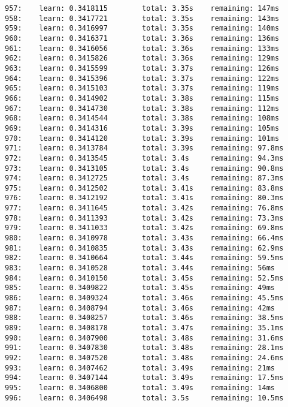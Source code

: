 \documentclass[11pt]{article}
\begin{document}
\begin{Verbatim}[commandchars=\\\{\}]
957:    learn: 0.3418115        total: 3.35s    remaining: 147ms
958:    learn: 0.3417721        total: 3.35s    remaining: 143ms
959:    learn: 0.3416997        total: 3.35s    remaining: 140ms
960:    learn: 0.3416371        total: 3.36s    remaining: 136ms
961:    learn: 0.3416056        total: 3.36s    remaining: 133ms
962:    learn: 0.3415826        total: 3.36s    remaining: 129ms
963:    learn: 0.3415599        total: 3.37s    remaining: 126ms
964:    learn: 0.3415396        total: 3.37s    remaining: 122ms
965:    learn: 0.3415103        total: 3.37s    remaining: 119ms
966:    learn: 0.3414902        total: 3.38s    remaining: 115ms
967:    learn: 0.3414730        total: 3.38s    remaining: 112ms
968:    learn: 0.3414544        total: 3.38s    remaining: 108ms
969:    learn: 0.3414316        total: 3.39s    remaining: 105ms
970:    learn: 0.3414120        total: 3.39s    remaining: 101ms
971:    learn: 0.3413784        total: 3.39s    remaining: 97.8ms
972:    learn: 0.3413545        total: 3.4s     remaining: 94.3ms
973:    learn: 0.3413105        total: 3.4s     remaining: 90.8ms
974:    learn: 0.3412725        total: 3.4s     remaining: 87.3ms
975:    learn: 0.3412502        total: 3.41s    remaining: 83.8ms
976:    learn: 0.3412192        total: 3.41s    remaining: 80.3ms
977:    learn: 0.3411645        total: 3.42s    remaining: 76.8ms
978:    learn: 0.3411393        total: 3.42s    remaining: 73.3ms
979:    learn: 0.3411033        total: 3.42s    remaining: 69.8ms
980:    learn: 0.3410978        total: 3.43s    remaining: 66.4ms
981:    learn: 0.3410835        total: 3.43s    remaining: 62.9ms
982:    learn: 0.3410664        total: 3.44s    remaining: 59.5ms
983:    learn: 0.3410528        total: 3.44s    remaining: 56ms
984:    learn: 0.3410150        total: 3.45s    remaining: 52.5ms
985:    learn: 0.3409822        total: 3.45s    remaining: 49ms
986:    learn: 0.3409324        total: 3.46s    remaining: 45.5ms
987:    learn: 0.3408794        total: 3.46s    remaining: 42ms
988:    learn: 0.3408257        total: 3.46s    remaining: 38.5ms
989:    learn: 0.3408178        total: 3.47s    remaining: 35.1ms
990:    learn: 0.3407900        total: 3.48s    remaining: 31.6ms
991:    learn: 0.3407830        total: 3.48s    remaining: 28.1ms
992:    learn: 0.3407520        total: 3.48s    remaining: 24.6ms
993:    learn: 0.3407462        total: 3.49s    remaining: 21ms
994:    learn: 0.3407144        total: 3.49s    remaining: 17.5ms
995:    learn: 0.3406800        total: 3.49s    remaining: 14ms
996:    learn: 0.3406498        total: 3.5s     remaining: 10.5ms

\end{Verbatim}
\end{document}
